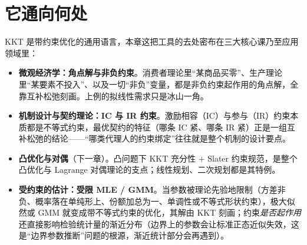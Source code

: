 \section{它通向何处}
\label{sec:kkt-beyond}

KKT 是带约束优化的通用语言，本章这把工具的去处密布在三大核心课乃至应用领域里：

\begin{itemize}
    \item \textbf{微观经济学：角点解与非负约束}。消费者理论里``某商品买零''、生产理论里``某要素不投入''、以及一切``非负''变量，都是非负约束起作用的角点解，全靠互补松弛刻画。上例的拟线性需求只是冰山一角。
    \item \textbf{机制设计与契约理论：IC 与 IR 约束}。激励相容（IC）与参与（IR）约束本质都是不等式约束，最优契约的特征（哪条 IC 紧、哪条 IR 紧）正是一组互补松弛的结论——``哪类代理人的约束绑定''往往就是整个机制的设计要点。
    \item \textbf{凸优化与对偶}（下一章）。凸问题下 KKT 充分性 + Slater 约束规范，是整个凸优化与 Lagrange 对偶理论的支点；线性规划、二次规划都是其特例。
    \item \textbf{受约束的估计：受限 MLE / GMM}。当参数被理论先验地限制（方差非负、概率落在单纯形上、份额加总为一、单调性或不等式形状约束），极大似然或 GMM 就变成带不等式约束的优化，其解由 KKT 刻画；约束\emph{是否起作用}还直接影响检验统计量的渐近分布（边界上的参数会让标准正态近似失效，这是``边界参数推断''问题的根源，渐近统计部分会再遇到）。
\end{itemize}

